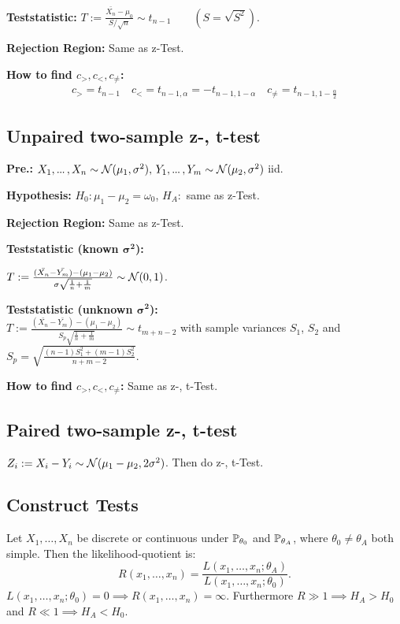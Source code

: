 \textbf{Teststatistic:} \(T := \frac{\bar{X_n} - \mu_0}{S / \sqrt{n}} \sim t_{n-1} \qquad (S = \sqrt{S^2})\).

\textbf{Rejection Region:} Same as z-Test.

\textbf{How to find \(c_>, c_<, c_{\neq}\):}
\begin{align*}
  c_> = t_{n-1} \quad c_< = t_{n-1, \alpha} = -t_{n-1, 1-\alpha} \quad c_{\neq} = t_{n-1, 1 - \frac{\alpha}{2}}
\end{align*}

\subsection{Unpaired two-sample z-, t-test}
\textbf{Pre.:} \(X_1, \sdots, X_{n} \sim \Normal(\mu_1, \sigma^2), \, Y_1, \sdots, Y_{m} \sim \Normal(\mu_2, \sigma^2)\) iid.

\textbf{Hypothesis:} \(H_0: \mu_1 - \mu_2 = \omega_0\), \(H_A:\) same as z-Test.

\textbf{Rejection Region:} Same as z-Test.

\textbf{Teststatistic (known \(\bm{\sigma^2}\)):}
\begin{center}
  \(T := \frac{(\bar{X_{n}} - \bar{Y_{m}}) - (\mu_1 - \mu_2)}{\sigma\sqrt{\frac{1}{n} + \frac{1}{m}}} \sim \Normal(0, 1)\).
\end{center}

\textbf{Teststatistic (unknown \(\bm{\sigma^2}\)):} \\
\(T := \frac{(\bar{X_{n}} - \bar{Y_{m}}) - (\mu_1 - \mu_2)}{S_p\sqrt{\frac{1}{n} + \frac{1}{m}}} \sim t_{m + n - 2}\) with sample variances \(S_1\), \(S_2\) and 
\(S_p = \sqrt{\frac{(n - 1)S_1^2 + (m - 1)S_2^2}{n + m - 2}}\).

\textbf{How to find \(c_>, c_<, c_{\neq}\):} Same as z-, t-Test.

\subsection{Paired two-sample z-, t-test}
\(Z_i := X_i - Y_i \sim \Normal(\mu_1 - \mu_2, 2\sigma^2)\). Then do z-, t-Test.

\subsection{Construct Tests}
Let \(X_1, \ldots, X_n\) be discrete or continuous under \(\P_{\theta_0}\) and \(\P_{\theta_A}\), where \(\theta_0 \neq \theta_A\) both simple. Then the likelihood-quotient is: \vspace{-7pt}
\[R(x_1, \ldots, x_n) = \frac{L(x_1, \ldots, x_n; \theta_A)}{L(x_1, \ldots, x_n; \theta_0)}.\]
\(L(x_1, \ldots, x_n; \theta_0) = 0 \implies R(x_1, \ldots, x_n) = \infty\). Furthermore \(R \gg 1 \implies H_A > H_0\) and \(R \ll 1 \implies H_A < H_0\).

